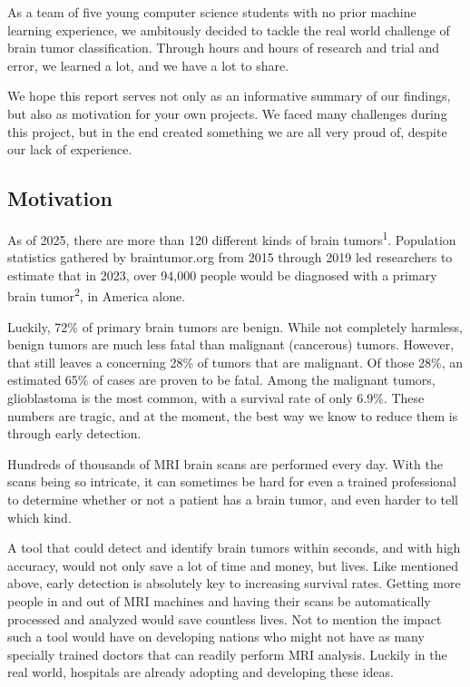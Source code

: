 \documentclass[conference]{IEEEtran}
\begin{document}
As a team of five young computer science students with no prior machine learning experience, we ambitously decided to tackle the real world challenge of brain tumor classification. Through hours and hours of research and trial and error, we learned a lot, and we have a lot to share. 

We hope this report serves not only as an informative summary of our findings, but also as motivation for your own projects. We faced many challenges during this project, but in the end created something we are all very proud of, despite our lack of experience.

\subsection{\large Motivation}

As of 2025, there are more than 120 different kinds of brain tumors\textsuperscript{1}. Population statistics gathered by braintumor.org from 2015 through 2019 led researchers to estimate that in 2023, over 94,000 people would be diagnosed with a primary brain tumor\textsuperscript{2}, in America alone. 

Luckily, 72\% of primary brain tumors are benign. While not completely harmless, benign tumors are much less fatal than malignant (cancerous) tumors. However, that still leaves a concerning 28\% of tumors that are malignant. Of those 28\%, an estimated 65\% of cases are proven to be fatal. Among the malignant tumors, glioblastoma is the most common, with a survival rate of only 6.9\%. These numbers are tragic, and at the moment, the best way we know to reduce them is through early detection.

Hundreds of thousands of MRI brain scans are performed every day. With the scans being so intricate, it can sometimes be hard for even a trained professional to determine whether or not a patient has a brain tumor, and even harder to tell which kind. 

A tool that could detect and identify brain tumors within seconds, and with high accuracy, would not only save a lot of time and money, but lives. Like mentioned above, early detection is absolutely key to increasing survival rates. Getting more people in and out of MRI machines and having their scans be automatically processed and analyzed would save countless lives. Not to mention the impact such a tool would have on developing nations who might not have as many specially trained doctors that can readily perform MRI analysis. Luckily in the real world, hospitals are already adopting and developing these ideas. 
\end{document}
